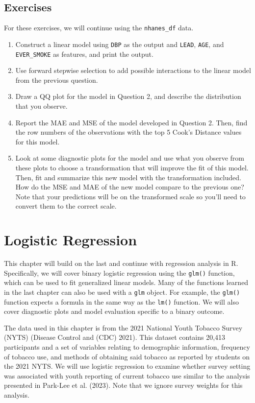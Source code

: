 \documentclass[
  letterpaper,
]{krantz}
\begin{document}
\section{Exercises}\label{exercises-8}

For these exercises, we will continue using the \texttt{nhanes\_df}
data.

\begin{enumerate}
\def\labelenumi{\arabic{enumi}.}
\item
  Construct a linear model using \texttt{DBP} as the output and
  \texttt{LEAD}, \texttt{AGE}, and \texttt{EVER\_SMOKE} as features, and
  print the output.
\item
  Use forward stepwise selection to add possible interactions to the
  linear model from the previous question.
\item
  Draw a QQ plot for the model in Question 2, and describe the
  distribution that you observe.
\item
  Report the MAE and MSE of the model developed in Question 2. Then,
  find the row numbers of the observations with the top 5 Cook's
  Distance values for this model.
\item
  Look at some diagnostic plots for the model and use what you observe
  from these plots to choose a transformation that will improve the fit
  of this model. Then, fit and summarize this new model with the
  transformation included. How do the MSE and MAE of the new model
  compare to the previous one? Note that your predictions will be on the
  transformed scale so you'll need to convert them to the correct scale.
\end{enumerate}

\chapter{Logistic Regression}\label{sec-logistic-regression}

This chapter will build on the last and continue with regression
analysis in R. Specifically, we will cover binary logistic regression
using the \texttt{glm()} function, which can be used to fit generalized
linear models. Many of the functions learned in the last chapter can
also be used with a \texttt{glm} object. For example, the \texttt{glm()}
function expects a formula in the same way as the \texttt{lm()}
function. We will also cover diagnostic plots and model evaluation
specific to a binary outcome.

The data used in this chapter is from the 2021 National Youth Tobacco
Survey (NYTS) (Disease Control and (CDC) 2021). This dataset contains
20,413 participants and a set of variables relating to demographic
information, frequency of tobacco use, and methods of obtaining said
tobacco as reported by students on the 2021 NYTS. We will use logistic
regression to examine whether survey setting was associated with youth
reporting of current tobacco use similar to the analysis presented in
Park-Lee et al. (2023). Note that we ignore survey weights for this
analysis.
\end{document}
